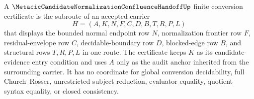 \begin{definition}
\label{def:metacic-finite-conversion-certificate-carrier}
A $\MetacicCandidateNormalizationConfluenceHandoffUp$ finite conversion certificate is the subroute of an accepted carrier
$$
H=(A,K,N,F,C,D,B,T,R,P,L)
$$
that displays the bounded normal endpoint row $N$, normalization frontier row $F$, residual-envelope row $C$, decidable-boundary row $D$, blocked-edge row $B$, and structural rows $T,R,P,L$ in one route. The certificate keeps $K$ as its candidate-evidence entry condition and uses $A$ only as the audit anchor inherited from the surrounding carrier. It has no coordinate for global conversion decidability, full Church--Rosser, unrestricted subject reduction, evaluator equality, quotient syntax equality, or closed consistency.
\end{definition}

